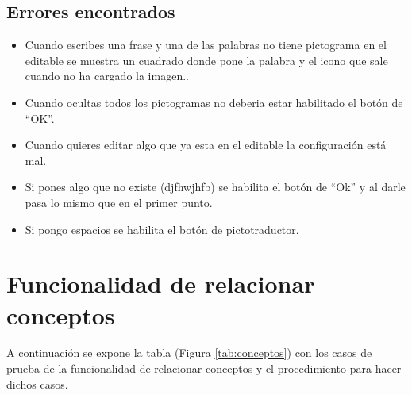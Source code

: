 \subsection{Errores encontrados}
\label{errores:pictotra}
\begin{itemize}
    \item Cuando escribes una frase y una de las palabras no tiene pictograma en el editable se muestra un cuadrado donde pone la palabra y el icono que sale cuando no ha cargado la imagen..
    \item Cuando ocultas todos los pictogramas no deberia estar habilitado el botón de ``OK''.
    \item  Cuando quieres editar algo que ya esta en el editable la configuración está mal.
    \item Si pones algo que no existe (djfhwjhfb) se habilita el botón de ``Ok'' y al darle pasa lo mismo que en el primer punto.
    \item  Si pongo espacios se habilita el botón de pictotraductor.
\end{itemize}


\section{Funcionalidad de relacionar conceptos}
\label{planPruebas:conceptos}
A continuación se expone la tabla (Figura \ref{tab:conceptos}) con los casos de prueba de la funcionalidad de relacionar conceptos y el procedimiento para hacer dichos casos.

